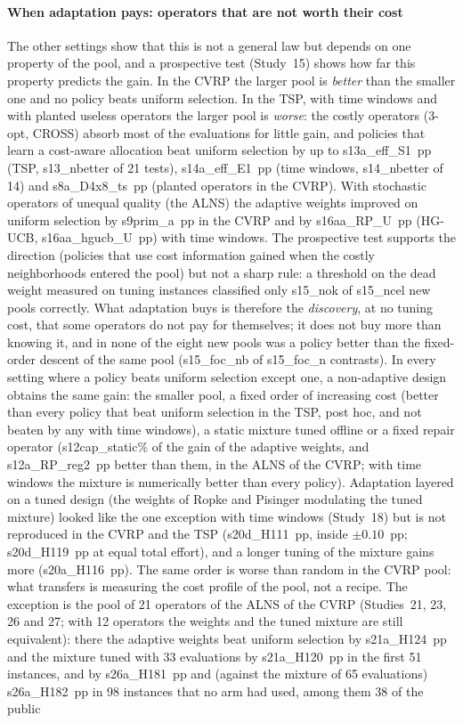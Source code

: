 \paragraph{When adaptation pays: operators that are not worth their cost}
The other settings show that this is not a general law but depends on one property of the pool, and a prospective test (Study~15) shows how far this property predicts the gain. In the CVRP the larger pool is \emph{better} than the smaller one and no policy beats uniform selection. In the TSP, with time windows and with planted useless operators the larger pool is \emph{worse}: the costly operators (3-opt, CROSS) absorb most of the evaluations for little gain, and policies that learn a cost-aware allocation beat uniform selection by up to \num{s13a_eff_S1}~pp (TSP, \num{s13_nbetter} of 21 tests), \num{s14a_eff_E1}~pp (time windows, \num{s14_nbetter} of 14) and \num{s8a_D4x8_ts}~pp (planted operators in the CVRP). With stochastic operators of unequal quality (the ALNS) the adaptive weights improved on uniform selection by \num{s9prim_a}~pp in the CVRP and by \num{s16aa_RP_U}~pp (HG-UCB, \num{s16aa_hgucb_U}~pp) with time windows. The prospective test supports the direction (policies that use cost information gained when the costly neighborhoods entered the pool) but not a sharp rule: a threshold on the dead weight measured on tuning instances classified only \num{s15_nok} of \num{s15_ncel} new pools correctly. What adaptation buys is therefore the \emph{discovery}, at no tuning cost, that some operators do not pay for themselves; it does not buy more than knowing it, and in none of the eight new pools was a policy better than the fixed-order descent of the same pool (\num{s15_foc_nb} of \num{s15_foc_n} contrasts). In every setting where a policy beats uniform selection except one, a non-adaptive design obtains the same gain: the smaller pool, a fixed order of increasing cost (better than every policy that beat uniform selection in the TSP, post hoc, and not beaten by any with time windows), a static mixture tuned offline or a fixed repair operator (\num{s12cap_static}\% of the gain of the adaptive weights, and \num{s12a_RP_reg2}~pp better than them, in the ALNS of the CVRP; with time windows the mixture is numerically better than every policy). Adaptation layered on a tuned design (the weights of Ropke and Pisinger modulating the tuned mixture) looked like the one exception with time windows (Study~18) but is not reproduced in the CVRP and the TSP (\num{s20d_H111}~pp, inside $\pm0.10$~pp; \num{s20d_H119}~pp at equal total effort), and a longer tuning of the mixture gains more (\num{s20a_H116}~pp). The same order is worse than random in the CVRP pool: what transfers is measuring the cost profile of the pool, not a recipe. The exception is the pool of 21 operators of the ALNS of the CVRP (Studies~21, 23, 26 and 27; with 12 operators the weights and the tuned mixture are still equivalent): there the adaptive weights beat uniform selection by \num{s21a_H124}~pp and the mixture tuned with 33 evaluations by \num{s21a_H120}~pp in the first 51 instances, and by \num{s26a_H181}~pp and (against the mixture of 65 evaluations) \num{s26a_H182}~pp in 98 instances that no arm had used, among them 38 of the public 